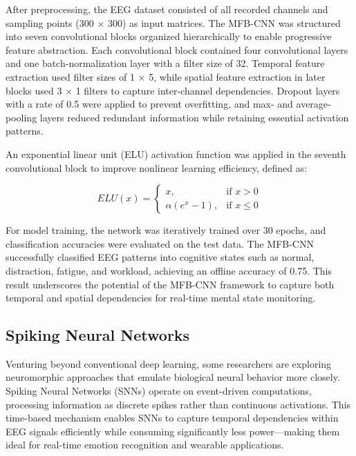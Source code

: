 \documentclass[conference]{IEEEtran}
\begin{document}
After preprocessing, the EEG dataset consisted of all recorded channels and sampling points (300 × 300) as input matrices. The MFB-CNN was structured into seven convolutional blocks organized hierarchically to enable progressive feature abstraction. Each convolutional block contained four convolutional layers and one batch-normalization layer with a filter size of 32. Temporal feature extraction used filter sizes of 1 × 5, while spatial feature extraction in later blocks used 3 × 1 filters to capture inter-channel dependencies. Dropout layers with a rate of 0.5 were applied to prevent overfitting, and max- and average-pooling layers reduced redundant information while retaining essential activation patterns.

An exponential linear unit (ELU) activation function was applied in the seventh convolutional block to improve nonlinear learning efficiency, defined as:

\begin{equation}
ELU(x) =
\begin{cases}
x, & \text{if } x > 0 \\
\alpha (e^{x} - 1), & \text{if } x \leq 0
\end{cases}
\end{equation}

For model training, the network was iteratively trained over 30 epochs, and classification accuracies were evaluated on the test data. The MFB-CNN successfully classified EEG patterns into cognitive states such as normal, distraction, fatigue, and workload, achieving an offline accuracy of 0.75. This result underscores the potential of the MFB-CNN framework to capture both temporal and spatial dependencies for real-time mental state monitoring.


\subsection{Spiking Neural Networks}
Venturing beyond conventional deep learning, some researchers are exploring neuromorphic approaches that emulate biological neural behavior more closely. Spiking Neural Networks (SNNs) \cite{Luo2020SNN_EEGEmotion} operate on event-driven computations, processing information as discrete spikes rather than continuous activations. This time-based mechanism enables SNNs to capture temporal dependencies within EEG signals efficiently while consuming significantly less power—making them ideal for real-time emotion recognition and wearable applications.
\end{document}
